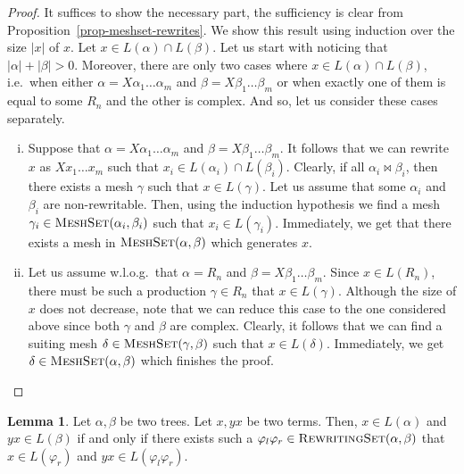 \documentclass[11pt,a4paper]{amsart}
\theoremstyle{definition}
\newtheorem{lemma}[theorem]{Lemma}
\newcommand{\RewritingSet}[2]{\textsc{RewritingSet}(#1,#2)}
\newcommand{\MeshSet}[2]{\textsc{MeshSet}(#1,#2)}
\begin{document}
\begin{proof}
    It suffices to show the necessary part, the sufficiency is clear from
    Proposition~\ref{prop-meshset-rewrites}. We show this result using
    induction over the size $|x|$ of $x$. Let $x \in L(\alpha) \cap L(\beta)$.
    Let us start with noticing that $|\alpha| + |\beta| > 0$. Moreover, there
    are only two cases where $x \in L(\alpha) \cap L(\beta)$, i.e.~when either $\alpha = X \alpha_1 \ldots \alpha_m$ and $\beta = X \beta_1
    \ldots \beta_m$ or when exactly one of them is equal to some $R_n$ and the other
    is complex. And so, let us consider these cases separately.
    \begin{enumerate}[(i)]
        \item Suppose that $\alpha = X \alpha_1 \ldots \alpha_m$ and $\beta = X \beta_1
                \ldots \beta_m$. It follows that we can rewrite $x$ as $X x_1
                \ldots x_m$ such that $x_i \in L(\alpha_i) \cap L(\beta_i)$.
                Clearly, if all $\alpha_i \bowtie \beta_i$, then there exists a mesh
                $\gamma$ such that $x \in L(\gamma)$. Let us assume that some
                $\alpha_i$ and $\beta_i$ are non-rewritable. Then, using
                the induction hypothesis we find a mesh $\gamma_i \in
                \MeshSet{\alpha_i}{\beta_i}$ such that $x_i \in L(\gamma_i)$.
                Immediately, we get that there exists a mesh in $\MeshSet{\alpha}{\beta}$
                which generates $x$.
        \item Let us assume w.l.o.g.~that $\alpha = R_n$ and $\beta = X \beta_1
                \ldots \beta_m$. Since $x \in L(R_n)$, there must be such a
                production $\gamma \in R_n$ that $x \in L(\gamma)$. Although the
                size of $x$ does not decrease, note that we can reduce this case
                to the one considered above since both $\gamma$ and $\beta$ are
                complex. Clearly, it follows that we can find a suiting
                mesh $\delta \in \MeshSet{\gamma}{\beta}$ such that $x \in
                L(\delta)$. Immediately, we get $\delta \in
                \MeshSet{\alpha}{\beta}$ which finishes the proof.
    \end{enumerate}
\end{proof}

\begin{lemma}\label{lem-rewritingset-crutial}
    Let $\alpha,\beta$ be two trees. Let $x, yx$ be two terms. Then,
    $x \in L(\alpha)$ and $y x \in L(\beta)$ if and only if there exists
    such a $\varphi_l \varphi_r \in \RewritingSet{\alpha}{\beta}$
    that $x \in L(\varphi_r)$ and $y x \in L(\varphi_l \varphi_r)$.
\end{lemma}
\end{document}
